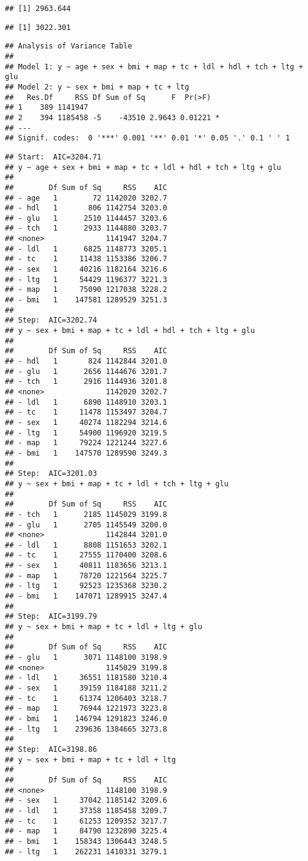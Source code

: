 \documentclass[
]{article}
\begin{document}
\begin{verbatim}
## [1] 2963.644
\end{verbatim}

\begin{verbatim}
## [1] 3022.301
\end{verbatim}

\begin{verbatim}
## Analysis of Variance Table
## 
## Model 1: y ~ age + sex + bmi + map + tc + ldl + hdl + tch + ltg + glu
## Model 2: y ~ sex + bmi + map + tc + ltg
##   Res.Df     RSS Df Sum of Sq      F  Pr(>F)  
## 1    389 1141947                              
## 2    394 1185458 -5    -43510 2.9643 0.01221 *
## ---
## Signif. codes:  0 '***' 0.001 '**' 0.01 '*' 0.05 '.' 0.1 ' ' 1
\end{verbatim}

\begin{verbatim}
## Start:  AIC=3204.71
## y ~ age + sex + bmi + map + tc + ldl + hdl + tch + ltg + glu
## 
##        Df Sum of Sq     RSS    AIC
## - age   1        72 1142020 3202.7
## - hdl   1       806 1142754 3203.0
## - glu   1      2510 1144457 3203.6
## - tch   1      2933 1144880 3203.7
## <none>              1141947 3204.7
## - ldl   1      6825 1148773 3205.1
## - tc    1     11438 1153386 3206.7
## - sex   1     40216 1182164 3216.6
## - ltg   1     54429 1196377 3221.3
## - map   1     75090 1217038 3228.2
## - bmi   1    147581 1289529 3251.3
## 
## Step:  AIC=3202.74
## y ~ sex + bmi + map + tc + ldl + hdl + tch + ltg + glu
## 
##        Df Sum of Sq     RSS    AIC
## - hdl   1       824 1142844 3201.0
## - glu   1      2656 1144676 3201.7
## - tch   1      2916 1144936 3201.8
## <none>              1142020 3202.7
## - ldl   1      6890 1148910 3203.1
## - tc    1     11478 1153497 3204.7
## - sex   1     40274 1182294 3214.6
## - ltg   1     54900 1196920 3219.5
## - map   1     79224 1221244 3227.6
## - bmi   1    147570 1289590 3249.3
## 
## Step:  AIC=3201.03
## y ~ sex + bmi + map + tc + ldl + tch + ltg + glu
## 
##        Df Sum of Sq     RSS    AIC
## - tch   1      2185 1145029 3199.8
## - glu   1      2705 1145549 3200.0
## <none>              1142844 3201.0
## - ldl   1      8808 1151653 3202.1
## - tc    1     27555 1170400 3208.6
## - sex   1     40811 1183656 3213.1
## - map   1     78720 1221564 3225.7
## - ltg   1     92523 1235368 3230.2
## - bmi   1    147071 1289915 3247.4
## 
## Step:  AIC=3199.79
## y ~ sex + bmi + map + tc + ldl + ltg + glu
## 
##        Df Sum of Sq     RSS    AIC
## - glu   1      3071 1148100 3198.9
## <none>              1145029 3199.8
## - ldl   1     36551 1181580 3210.4
## - sex   1     39159 1184188 3211.2
## - tc    1     61374 1206403 3218.7
## - map   1     76944 1221973 3223.8
## - bmi   1    146794 1291823 3246.0
## - ltg   1    239636 1384665 3273.8
## 
## Step:  AIC=3198.86
## y ~ sex + bmi + map + tc + ldl + ltg
## 
##        Df Sum of Sq     RSS    AIC
## <none>              1148100 3198.9
## - sex   1     37042 1185142 3209.6
## - ldl   1     37358 1185458 3209.7
## - tc    1     61253 1209352 3217.7
## - map   1     84790 1232890 3225.4
## - bmi   1    158343 1306443 3248.5
## - ltg   1    262231 1410331 3279.1
\end{verbatim}
\end{document}
